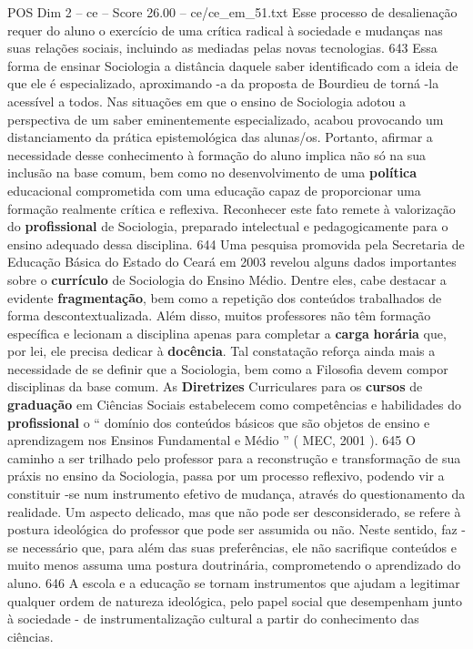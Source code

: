 \begin{textsample}{POS Dim 2 – ce – Score 26.00 – ce/ce\_em\_51.txt}
Esse processo de desalienação requer do aluno o exercício de uma crítica radical à sociedade e mudanças nas suas relações sociais, incluindo as mediadas pelas novas tecnologias. 643 Essa forma de ensinar Sociologia a distância daquele saber identificado com a ideia de que ele é especializado, aproximando -a da proposta de Bourdieu de torná -la acessível a todos.
Nas situações em que o ensino de Sociologia adotou a perspectiva de um saber eminentemente especializado, acabou provocando um distanciamento da prática epistemológica das alunas/os.
Portanto, afirmar a necessidade desse conhecimento à formação do aluno implica não só na sua inclusão na base comum, bem como no desenvolvimento de uma \textbf{política} educacional comprometida com uma educação capaz de proporcionar uma formação realmente crítica e reflexiva.
Reconhecer este fato remete à valorização do \textbf{profissional} de Sociologia, preparado intelectual e pedagogicamente para o ensino adequado dessa disciplina. 644 Uma pesquisa promovida pela Secretaria de Educação Básica do Estado do Ceará em 2003 revelou alguns dados importantes sobre o \textbf{currículo} de Sociologia do Ensino Médio.
Dentre eles, cabe destacar a evidente \textbf{fragmentação}, bem como a repetição dos conteúdos trabalhados de forma descontextualizada.
Além disso, muitos professores não têm formação específica e lecionam a disciplina apenas para completar a \textbf{carga} \textbf{horária} que, por lei, ele precisa dedicar à \textbf{docência}.
Tal constatação reforça ainda mais a necessidade de se definir que a Sociologia, bem como a Filosofia devem compor disciplinas da base comum.
As \textbf{Diretrizes} Curriculares para os \textbf{cursos} de \textbf{graduação} em Ciências Sociais estabelecem como competências e habilidades do \textbf{profissional} o “ domínio dos conteúdos básicos que são objetos de ensino e aprendizagem nos Ensinos Fundamental e Médio ” ( MEC, 2001 ). 645 O caminho a ser trilhado pelo professor para a reconstrução e transformação de sua práxis no ensino da Sociologia, passa por um processo reflexivo, podendo vir a constituir -se num instrumento efetivo de mudança, através do questionamento da realidade.
Um aspecto delicado, mas que não pode ser desconsiderado, se refere à postura ideológica do professor que pode ser assumida ou não.
Neste sentido, faz -se necessário que, para além das suas preferências, ele não sacrifique conteúdos e muito menos assuma uma postura doutrinária, comprometendo o aprendizado do aluno. 646 A escola e a educação se tornam instrumentos que ajudam a legitimar qualquer ordem de natureza ideológica, pelo papel social que desempenham junto à sociedade - de instrumentalização cultural a partir do conhecimento das ciências.

\end{textsample}
